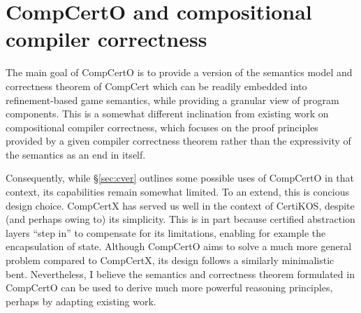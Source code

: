 \documentclass[11pt,oneside,draft]{book}
\theoremstyle{definition}
\begin{document}

\section{CompCertO and compositional compiler correctness}

The main goal of CompCertO
is to provide a version of
the semantics model and correctness theorem of CompCert
which can be readily embedded into
refinement-based game semantics,
while providing a granular view of
program components.
This is a somewhat different inclination from
existing work on compositional compiler correctness,
which focuses on the proof principles provided by
a given compiler correctness theorem
rather than the expressivity of the semantics
as an end in itself.

Consequently,
while \S\ref{sec:cver}
outlines some possible uses of CompCertO in that context,
its capabilities remain somewhat limited.
To an extend, this is concious design choice.
CompCertX has served us well
in the context of CertiKOS,
despite (and perhaps owing to) its simplicity.
This is in part because certified abstraction layers
``step in'' to compensate for its limitations,
enabling for example the encapsulation of state.
Although CompCertO aims to solve
a much more general problem compared to CompCertX,
its design follows a similarly minimalistic bent.
Nevertheless,
I believe the semantics and correctness theorem
formulated in CompCertO
can be used to derive much more powerful
reasoning principles,
perhaps by adapting existing work.
\end{document}
